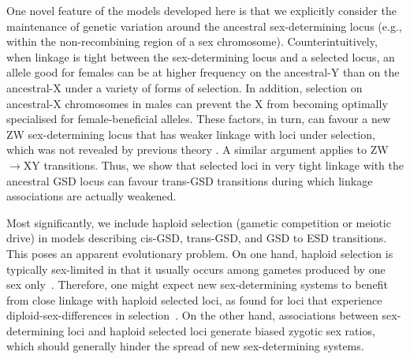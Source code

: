 \documentclass[10pt,letterpaper]{article}
\begin{document}
One novel feature of the models developed here is that we explicitly consider the maintenance of genetic variation around the ancestral sex-determining locus (e.g., within the non-recombining region of a sex chromosome).  
Counterintuitively, when linkage is tight between the sex-determining locus and a selected locus, an allele good for females can be at higher frequency on the ancestral-Y than on the ancestral-X under a variety of forms of selection.
In addition, selection on ancestral-X chromosomes in males can prevent the X from becoming optimally specialised for female-beneficial alleles. 
These factors, in turn, can favour a new ZW sex-determining locus that has weaker linkage with loci under selection, which was not revealed by previous theory \cite{vanDoorn:2010hu}. A similar argument applies to ZW$\rightarrow$XY transitions. 
Thus, we show that selected loci in very tight linkage with the ancestral GSD locus can favour trans-GSD transitions during which linkage associations are actually weakened. 

Most significantly, we include haploid selection (gametic competition or meiotic drive) in models describing cis-GSD, trans-GSD, and GSD to ESD transitions.
This poses an apparent evolutionary problem. 
On one hand, haploid selection is typically sex-limited in that it usually occurs among gametes produced by one sex only~\cite{Mulcahy:1996ha,JOSEPH:2004haa,Ubeda:2005gw,Lindholm:2016cw}. 
Therefore, one might expect new sex-determining systems to benefit from close linkage with haploid selected loci, as found for loci that experience diploid-sex-differences in selection~\cite{vanDoorn:2007eu,vanDoorn:2010hu, Muralidhar2018}. 
On the other hand, associations between sex-determining loci and haploid selected loci generate biased zygotic sex ratios, which should generally hinder the spread of new sex-determining systems. 
\end{document}
